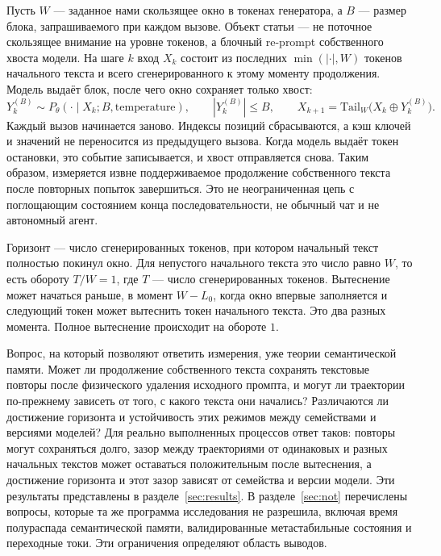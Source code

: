 \documentclass[10pt]{article}
\begin{document}
Пусть $W$ --- заданное нами скользящее окно в токенах генератора,
а $B$ --- размер блока, запрашиваемого при каждом вызове.
Объект статьи --- не поточное скользящее внимание на уровне токенов,
а блочный re-prompt собственного хвоста модели.
На шаге $k$ вход $X_k$ состоит из последних $\min(|\cdot|, W)$ токенов
начального текста и всего сгенерированного к этому моменту продолжения.
Модель выдаёт блок, после чего окно сохраняет только хвост:
\begin{equation}
  Y_k^{(B)}\sim P_\theta(\cdot\mid X_k; B,\text{temperature}),\qquad
  |Y_k^{(B)}|\le B,\qquad
  X_{k+1}=\mathrm{Tail}_W\bigl(X_k\oplus Y_k^{(B)}\bigr).
  \label{eq:kernel}
\end{equation}
Каждый вызов начинается заново.
Индексы позиций сбрасываются, а кэш ключей и значений не переносится
из предыдущего вызова.
Когда модель выдаёт токен остановки, это событие записывается,
и хвост отправляется снова.
Таким образом, измеряется извне поддерживаемое продолжение собственного
текста после повторных попыток завершиться.
Это не неограниченная цепь с поглощающим состоянием конца последовательности,
не обычный чат и не автономный агент.

Горизонт --- число сгенерированных токенов, при котором начальный текст
полностью покинул окно.
Для непустого начального текста это число равно $W$, то есть обороту
$T/W = 1$, где $T$ --- число сгенерированных токенов.
Вытеснение может начаться раньше, в момент $W-L_0$, когда окно впервые
заполняется и следующий токен может вытеснить токен начального текста.
Это два разных момента.
Полное вытеснение происходит на обороте $1$.

Вопрос, на который позволяют ответить измерения, уже теории семантической памяти.
Может ли продолжение собственного текста сохранять текстовые повторы после
физического удаления исходного промпта, и могут ли траектории по-прежнему
зависеть от того, с какого текста они начались?
Различаются ли достижение горизонта и устойчивость этих режимов
между семействами и версиями моделей?
Для реально выполненных процессов ответ таков: повторы могут сохраняться
долго, зазор между траекториями от одинаковых и разных начальных текстов
может оставаться положительным после вытеснения, а достижение горизонта
и этот зазор зависят от семейства и версии модели.
Эти результаты представлены в разделе~\ref{sec:results}.
В разделе~\ref{sec:not} перечислены вопросы, которые та же программа
исследования не разрешила, включая время полураспада семантической памяти,
валидированные метастабильные состояния и переходные токи.
Эти ограничения определяют область выводов.
\end{document}

